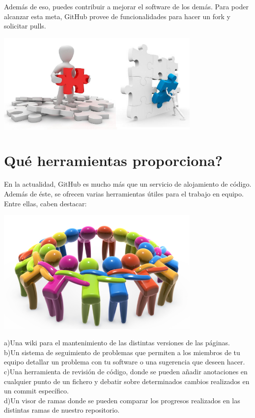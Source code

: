 \begin{itemize}
Además de eso, puedes contribuir a mejorar el software de los demás. Para poder alcanzar esta meta, GitHub provee de funcionalidades para hacer un fork y solicitar pulls.
\end{itemize} 

\begin{center}
\includegraphics[width=10cm]{./Imagenes/herramienta2} 
\end{center}

\section{Qué herramientas proporciona?}
\begin{itemize}
En la actualidad, GitHub es mucho más que un servicio de alojamiento de código. Además de éste, se ofrecen varias herramientas útiles para el trabajo en equipo. Entre ellas, caben destacar:\\
\end{itemize} 

\begin{center}
\includegraphics[width=10cm]{./Imagenes/equipo} 
\end{center}

\begin{itemize}
a)Una wiki para el mantenimiento de las distintas versiones de las páginas.\\
b)Un sistema de seguimiento de problemas que permiten a los miembros de tu equipo detallar un problema con tu software o una sugerencia que deseen hacer.\\
c)Una herramienta de revisión de código, donde se pueden añadir anotaciones en cualquier punto de un fichero y debatir sobre determinados cambios realizados en un commit específico.\\
d)Un visor de ramas donde se pueden comparar los progresos realizados en las distintas ramas de nuestro repositorio.
\end{itemize}
